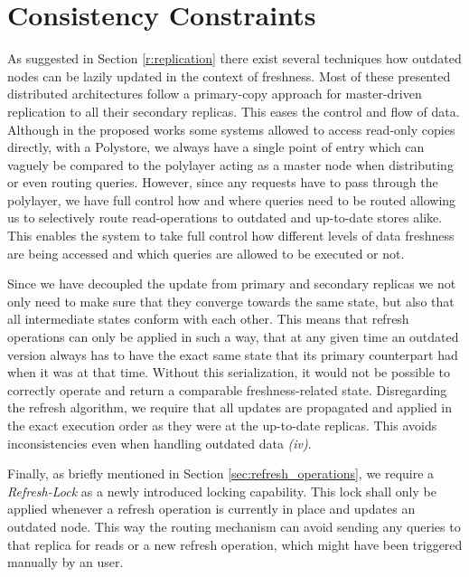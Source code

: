 

\section{Consistency Constraints}
\label{sec:consistency_concept}

As suggested in Section \ref{r:replication} there exist several techniques how outdated nodes can be lazily updated in the context of freshness.
Most of these presented distributed architectures follow a primary-copy approach for master-driven replication to all their secondary replicas.
This eases the control and flow of data. Although in the proposed works some systems allowed to access read-only copies directly,
with a Polystore, we always have a single point of entry which can vaguely be compared to the polylayer acting as a master node
when distributing or even routing queries. However, since any requests have to pass through the polylayer,
we have full control how and where queries need to be routed allowing us to selectively route read-operations to outdated and up-to-date stores alike.
This enables the system to take full control how different levels of data freshness are being accessed and which queries are allowed to be executed or not.

Since we have decoupled the update from primary and secondary replicas we not only need to make sure that they converge towards the same state, but also that 
all intermediate states conform with each other. This means that refresh operations can only be applied in such a way, that at any given time an outdated version always has
to have the exact same state that its primary counterpart had when it was at that time. Without this serialization, it would not be possible to correctly operate and return 
a comparable freshness-related state. 
Disregarding the refresh algorithm, we require that all updates are propagated and applied in the exact execution order as they were at the up-to-date 
replicas. This avoids inconsistencies even when handling outdated data \textit{(iv)}.

Finally, as briefly mentioned in Section \ref{sec:refresh_operations}, we require a \emph{Refresh-Lock} as a newly introduced locking capability.
This lock shall only be applied whenever a refresh operation is currently in place and updates an outdated node. 
This way the routing mechanism can avoid sending any queries to that replica for reads or a new refresh operation, which might have been triggered manually by an user.



